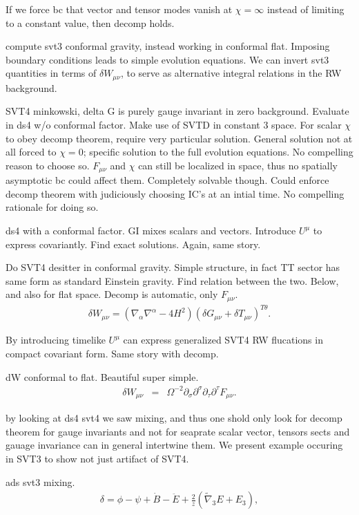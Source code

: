 If we force bc that vector and tensor modes vanish at $\chi=\infty$ instead of limiting to a constant value, then decomp holds. 

compute svt3 conformal gravity, instead working in conformal flat. Imposing boundary conditions leads to simple evolution equations. We can invert svt3 quantities in terms of $\delta W_{\mu\nu}$, to serve as alternative integral relations in the RW background. 

SVT4 minkowski, delta G is purely gauge invariant in zero background. Evaluate in ds4 w/o conformal factor. Make use of SVTD in constant 3 space. For scalar $\chi$ to obey decomp theorem, require very particular solution. General solution not at all forced to $\chi =0$; specific solution to the full evolution equations. No compelling reason to choose so. $F_{\mu\nu}$ and $\chi$ can still be localized in space, thus no spatially asymptotic bc could affect them. Completely solvable though. Could enforce decomp theorem with judiciously choosing IC's at an intial time. No compelling rationale for doing so. 

ds4 with a conformal factor. GI mixes scalars and vectors. Introduce $U^\mu$ to express covariantly. Find exact solutions. Again, same story. 

Do SVT4 desitter in conformal gravity. Simple structure, in fact TT sector has same form as standard Einstein gravity. Find relation between the two. Below, and also for flat space. Decomp is automatic, only $F_{\mu\nu}$. 
\begin{eqnarray}
\delta W_{\mu\nu}=(\nabla_{\alpha}\nabla^{\alpha}-4H^2)(\delta G_{\mu\nu}+\delta T_{\mu\nu})^{T\theta}.
\end{eqnarray}

By introducing timelike $U^\mu$ can express generalized SVT4 RW flucations in compact covariant form. Same story with decomp. 

dW conformal to flat. Beautiful super simple. 
\begin{eqnarray}
\delta W_{\mu\nu}&=&\Omega^{-2}\partial_{\sigma}\partial^{\sigma}\partial_{\tau}\partial^{\tau}F_{\mu\nu}.
\end{eqnarray} 

by looking at ds4 svt4 we saw mixing, and thus one shold only look for decomp theorem for gauge invariants and not for seaprate scalar vector, tensors sects and gauage invariance can in general intertwine them. We present example occuring in SVT3 to show not just artifact of SVT4. 

ads svt3 mixing. 
\begin{eqnarray}
\delta = \phi -\psi + \dot B - \ddot E + \frac{2}{z}(\tilde\nabla_3 E + E_3),
\end{eqnarray}

